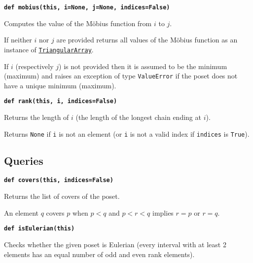 \documentclass[12pt]{article}
\begin{document}
\begin{child}
{{}\endlist}

\textbf{\hypertarget{Poset.mobius}{\texttt{def mobius(this, i=None, j=None, indices=False)}}}
{\list{}{\leftmargin 0.5cm}\item{
Computes the value of the M\"obius function from $i$ to $j$.

If neither $i$ nor $j$ are provided returns all values
of the M\"obius function as an instance of
\hyperlink{TriangularArray}{\texttt{TriangularArray}}.

If $i$ (respectively $j$) is not provided then it
is assumed to be the minimum (maximum) and raises 
an exception of type \verb|ValueError| if the poset
does not have a unique minimum (maximum).


}\endlist}

\textbf{\hypertarget{Poset.rank}{\texttt{def rank(this, i, indices=False)}}}
{\list{}{\leftmargin 0.5cm}\item{
Returns the length of $i$ (the length of the longest chain ending at $i$).

Returns \verb|None| if \verb|i| is not an element
(or \verb|i| is not a valid index if \verb|indices| is \verb|True|).


}\endlist}

\subsection{Queries}
\label{Queries}

\textbf{\hypertarget{Poset.covers}{\texttt{def covers(this, indices=False)}}}
{\list{}{\leftmargin 0.5cm}\item{
Returns the list of covers of the poset.

An element $q$ covers $p$ when $p<q$ and $p<r<q$ implies $r=p$ or $r=q$.


}\endlist}

\textbf{\hypertarget{Poset.isEulerian}{\texttt{def isEulerian(this)}}}
{\list{}{\leftmargin 0.5cm}\item{
Checks whether the given poset is Eulerian (every interval with at least 2 elements has an equal number of odd and even rank elements).


}\endlist}


\end{child}
\end{document}
